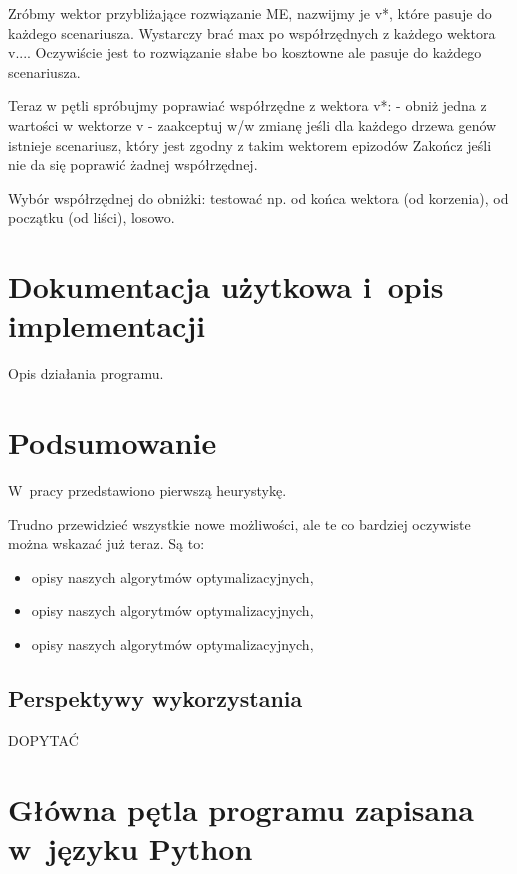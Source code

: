 \documentclass[licencjacka]{pracamgr}
\begin{document}
Zróbmy wektor przybliżające rozwiązanie ME, nazwijmy je v*, które pasuje do każdego scenariusza. Wystarczy brać max po współrzędnych z każdego wektora v....
Oczywiście jest to rozwiązanie słabe bo kosztowne ale pasuje do każdego scenariusza.

Teraz w pętli spróbujmy poprawiać współrzędne z wektora v*:
- obniż jedna z wartości w wektorze v
- zaakceptuj w/w zmianę jeśli dla każdego drzewa genów istnieje scenariusz, który jest zgodny z takim wektorem epizodów
Zakończ jeśli nie da się poprawić żadnej współrzędnej.

Wybór współrzędnej do obniżki: testować np. od końca wektora (od korzenia), od początku (od liści), losowo.

\chapter{Dokumentacja użytkowa i~opis implementacji}\label{r:impl}

Opis działania programu.

\chapter{Podsumowanie}

W~pracy przedstawiono pierwszą heurystykę.

Trudno przewidzieć wszystkie nowe możliwości, ale te co bardziej
oczywiste można wskazać już teraz.  Są to:
\begin{itemize}
\item opisy naszych algorytmów optymalizacyjnych,
\item opisy naszych algorytmów optymalizacyjnych,
\item opisy naszych algorytmów optymalizacyjnych,
\end{itemize}

\section{Perspektywy wykorzystania}

DOPYTAĆ

\appendix

\chapter{Główna pętla programu zapisana w~języku Python}
\end{document}
